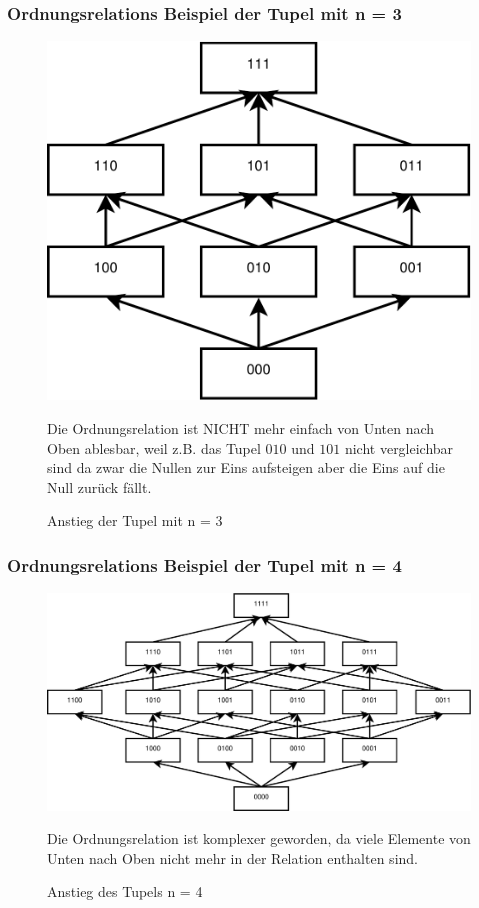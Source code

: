 \documentclass[hyperref={pdfpagelabels=false}]{beamer} %
\begin{document}
  \subsubsection*{Ordnungsrelations Beispiel der Tupel mit n = 3}
  \begin{frame}
    \begin{figure}
      \includegraphics[scale=0.30]{images/m3.pdf}
      \caption{Anstieg der Tupel mit n = 3}
      Die Ordnungsrelation ist NICHT mehr einfach von Unten nach Oben ablesbar, weil z.B. das Tupel $010$ und $101$ nicht vergleichbar sind da zwar die Nullen zur Eins aufsteigen aber die Eins auf die Null zur\"uck f\"allt.
    \end{figure}
  \end{frame}

  \subsubsection*{Ordnungsrelations Beispiel der Tupel mit n = 4}
  \begin{frame}
    \begin{figure}
      \includegraphics[scale=0.30]{images/m4.pdf}
      \caption{Anstieg des Tupels n = 4}
      Die Ordnungsrelation ist komplexer geworden, da viele Elemente von Unten nach Oben nicht mehr in der Relation enthalten sind.
    \end{figure}
  \end{frame}
\end{document}
